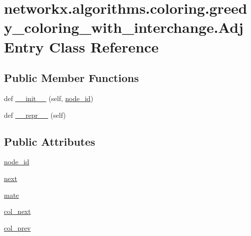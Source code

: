\hypertarget{classnetworkx_1_1algorithms_1_1coloring_1_1greedy__coloring__with__interchange_1_1AdjEntry}{}\section{networkx.\+algorithms.\+coloring.\+greedy\+\_\+coloring\+\_\+with\+\_\+interchange.\+Adj\+Entry Class Reference}
\label{classnetworkx_1_1algorithms_1_1coloring_1_1greedy__coloring__with__interchange_1_1AdjEntry}
\subsection*{Public Member Functions}
\begin{DoxyCompactItemize}
\item 
def \hyperlink{classnetworkx_1_1algorithms_1_1coloring_1_1greedy__coloring__with__interchange_1_1AdjEntry_a92ccebffccaeab6d0d6af706b7713706}{\+\_\+\+\_\+init\+\_\+\+\_\+} (self, \hyperlink{classnetworkx_1_1algorithms_1_1coloring_1_1greedy__coloring__with__interchange_1_1AdjEntry_ad0ed768ba6264af75a6e6d7934f101c7}{node\+\_\+id})
\item 
def \hyperlink{classnetworkx_1_1algorithms_1_1coloring_1_1greedy__coloring__with__interchange_1_1AdjEntry_a9fa9b81310d987070e9e7bd0e461bd3d}{\+\_\+\+\_\+repr\+\_\+\+\_\+} (self)
\end{DoxyCompactItemize}
\subsection*{Public Attributes}
\begin{DoxyCompactItemize}
\item 
\hyperlink{classnetworkx_1_1algorithms_1_1coloring_1_1greedy__coloring__with__interchange_1_1AdjEntry_ad0ed768ba6264af75a6e6d7934f101c7}{node\+\_\+id}
\item 
\hyperlink{classnetworkx_1_1algorithms_1_1coloring_1_1greedy__coloring__with__interchange_1_1AdjEntry_a9d92d242486c68e9c403013f6d87c336}{next}
\item 
\hyperlink{classnetworkx_1_1algorithms_1_1coloring_1_1greedy__coloring__with__interchange_1_1AdjEntry_a5161a5214bedd8afde42c125ee7ae687}{mate}
\item 
\hyperlink{classnetworkx_1_1algorithms_1_1coloring_1_1greedy__coloring__with__interchange_1_1AdjEntry_adf28f749f13e131217cd04534a1f3551}{col\+\_\+next}
\item 
\hyperlink{classnetworkx_1_1algorithms_1_1coloring_1_1greedy__coloring__with__interchange_1_1AdjEntry_a9d9d29253cc9ff194739255e48efedec}{col\+\_\+prev}
\end{DoxyCompactItemize}


